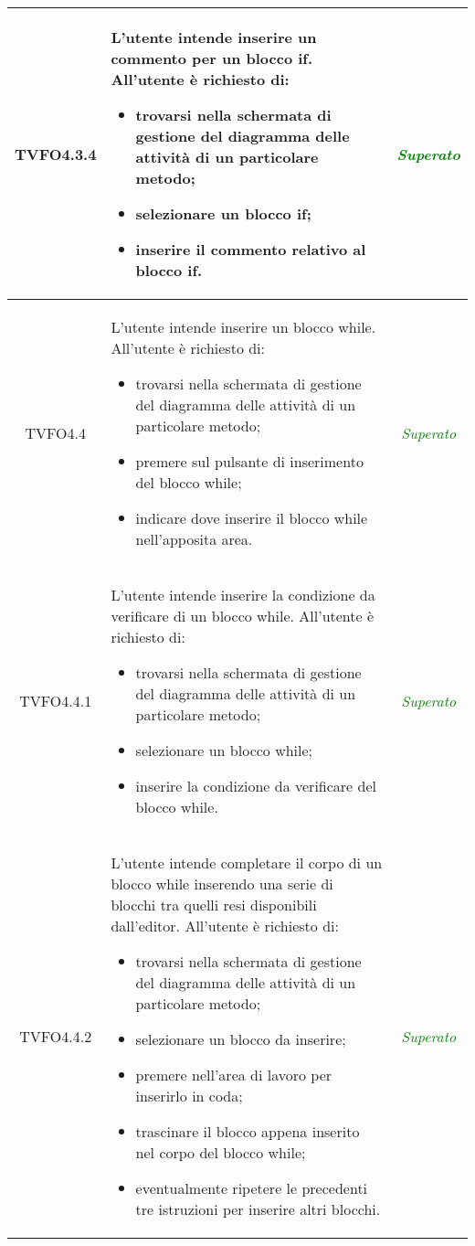 \begin{longtable}{|c|>{}m{8cm}|c|}
\hypertarget{TVFO4.3.4}{TVFO4.3.4} & L'utente intende inserire un commento per un blocco if.
All'utente è richiesto di:
\begin{itemize}
	\item trovarsi nella schermata di gestione del diagramma delle attività di un particolare metodo;
	\item selezionare un blocco if;
	\item inserire il commento relativo al blocco if.
\end{itemize} & \textcolor{Green}{\textit{Superato}}\\ \hline

\hypertarget{TVFO4.4}{TVFO4.4} & L'utente intende inserire un blocco while.
All'utente è richiesto di:
\begin{itemize}
	\item trovarsi nella schermata di gestione del diagramma delle attività di un particolare metodo;
	\item premere sul pulsante di inserimento del blocco while;
	\item indicare dove inserire il blocco while nell'apposita area.
\end{itemize} & \textcolor{Green}{\textit{Superato}}\\ \hline

\hypertarget{TVFO4.4.1}{TVFO4.4.1} & L'utente intende inserire la condizione da verificare di un blocco while.
All'utente è richiesto di:
\begin{itemize}
	\item trovarsi nella schermata di gestione del diagramma delle attività di un particolare metodo;
	\item selezionare un blocco while;
	\item inserire la condizione da verificare del blocco while.
\end{itemize} & \textcolor{Green}{\textit{Superato}}\\ \hline

\hypertarget{TVFO4.4.2}{TVFO4.4.2} & L'utente intende completare il corpo di un blocco while inserendo una serie di blocchi tra quelli resi disponibili dall'editor.
All'utente è richiesto di:
\begin{itemize}
	\item trovarsi nella schermata di gestione del diagramma delle attività di un particolare metodo;
	\item selezionare un blocco da inserire;
	\item premere nell'area di lavoro per inserirlo in coda;
	\item trascinare il blocco appena inserito nel corpo del blocco while;
	\item eventualmente ripetere le precedenti tre istruzioni per inserire altri blocchi.
\end{itemize} & \textcolor{Green}{\textit{Superato}}\\ \hline


\end{longtable}
